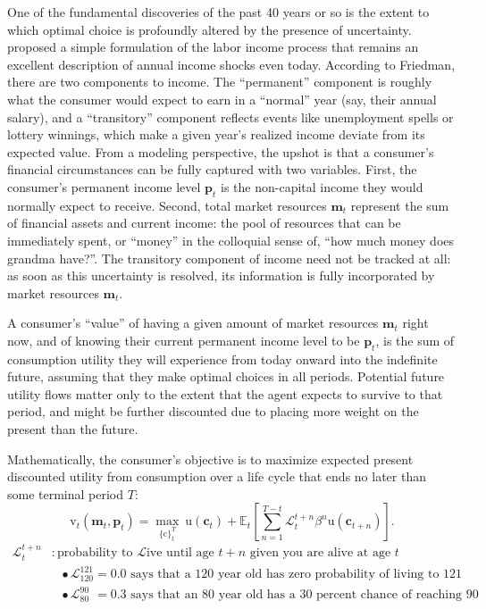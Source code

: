 \documentclass[12pt,letterpaper, fleqn]{article}
\newcommand{\uFunc}{\mathrm{u}}
\newcommand{\cLvl}{\mathbf{c}}
\newcommand{\mLvl}{\mathbf{m}}
\newcommand{\pLvl}{\mathbf{p}}
\newcommand{\DiscFac}{\beta}
\newcommand{\cFunc}{\mathrm{c}}
\newcommand{\vFunc}{\mathrm{v}}
\newcommand{\Alive}{\mathcal{L}}
\newcommand{\Ex}{\mathbb{E}}
\begin{document}
One of the fundamental discoveries of the past 40 years or so is the extent to which optimal choice is profoundly altered by the presence of uncertainty.
\cite{friedman1957} proposed a simple formulation of the labor income process that remains an excellent description of annual income shocks even today.  According to Friedman, there are two components to income.
The ``permanent'' component is roughly what the consumer would expect to earn in a ``normal'' year (say, their annual salary), and a ``transitory'' component reflects events like unemployment spells or lottery winnings, which make a given year's realized income deviate from its expected value.
From a modeling perspective, the upshot is that a consumer's financial circumstances can be fully captured with two variables.
First, the consumer's permanent income level $\pLvl_{t}$ is the non-capital income they would normally expect to receive.
Second, total market resources $\mLvl_{t}$ represent the sum of financial assets and current income: the pool of resources that can be immediately spent, or ``money'' in the colloquial sense of, ``how much money does grandma have?''.
The transitory component of income need not be tracked at all: as soon as this uncertainty is resolved, its information is fully incorporated by market resources $\mLvl_{t}$.

A consumer's ``value'' of having a given amount of market resources $\mLvl_{t}$ right now, and of knowing their current permanent income level to be $\pLvl_{t}$, is the sum of consumption utility they will experience from today onward into the indefinite future, assuming that they make optimal choices in all periods.
Potential future utility flows matter only to the extent that the agent expects to survive to that period, and might be further discounted due to placing more weight on the present than the future.

Mathematically, the consumer's objective is to maximize expected present discounted utility from consumption over a life cycle that ends no later than some terminal period $T$:
\begin{equation}
\label{eq:lifecyclemax}
\pmb{\vFunc}_{t}(\mLvl_{t},\pLvl_{t}) = \max_{\{\pmb{\cFunc}\}_{t}^{T}} ~ \uFunc(\cLvl_{t})+\Ex_{t}\left[\sum_{n=1}^{T-t} \Alive_{t}^{t+n}{\DiscFac}^{n} \uFunc(\cLvl_{t+n}) \right].
\end{equation}
\begin{align*}
    \Alive _{t}^{t+n} & : \text{probability to } \Alive \text{ive until age $t+n$ given you are alive at age $t$}
    \\                   & {~~~}\bullet \Alive_{120}^{121} = 0.0 \text{ says that a 120 year old has zero probability of living to 121}
    \\                   & {~~~}\bullet \Alive_{80\phantom{1}}^{90\phantom{1}} = 0.3 \text{ says that an 80 year old has a 30 percent chance of reaching 90}
    \end{align*}
\end{document}
